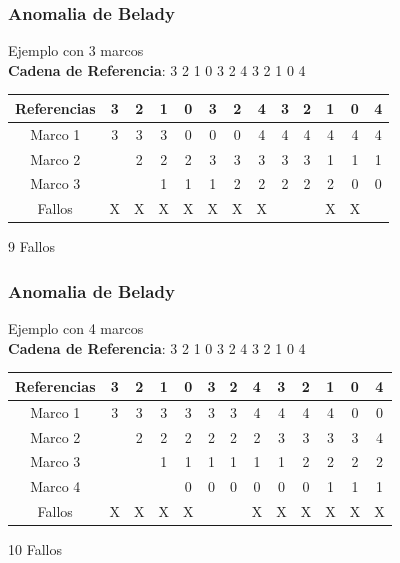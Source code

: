 \documentclass{beamer}
\begin{document}
\begin{frame}
	\begin{table}[h]
		\frametitle{Anomalia de Belady}
		Ejemplo con 3 marcos \\
		\textbf{Cadena de Referencia}: 3 2 1 0 3 2 4 3 2 1 0 4
		\begin{tabular}{|c||c|c|c|c|c|c|c|c|c|c|c|c|}
			\hline
			Referencias & 3 & 2 & 1 & 0 & 3 & 2 & 4 & 3 & 2 & 1 & 0 & 4 \\ \hline \hline
			Marco 1     & 3 & 3 & 3 & 0 & 0 & 0 & 4 & 4 & 4 & 4 & 4 & 4 \\ \hline
			Marco 2     &   & 2 & 2 & 2 & 3 & 3 & 3 & 3 & 3 & 1 & 1 & 1 \\ \hline
			Marco 3     &   &   & 1 & 1 & 1 & 2 & 2 & 2 & 2 & 2 & 0 & 0 \\ \hline
			Fallos      & X & X & X & X & X & X & X &   &   & X & X &   \\ \hline
		\end{tabular}
	\end{table}
	9 Fallos
\end{frame}

\begin{frame}
	\begin{table}[h]
		\frametitle{Anomalia de Belady}
		Ejemplo con 4 marcos \\
		\textbf{Cadena de Referencia}: 3 2 1 0 3 2 4 3 2 1 0 4
		\begin{tabular}{|c||c|c|c|c|c|c|c|c|c|c|c|c|}
			\hline
			Referencias & 3 & 2 & 1 & 0 & 3 & 2 & 4 & 3 & 2 & 1 & 0 & 4 \\ \hline \hline
			Marco 1     & 3 & 3 & 3 & 3 & 3 & 3 & 4 & 4 & 4 & 4 & 0 & 0 \\ \hline
			Marco 2     &   & 2 & 2 & 2 & 2 & 2 & 2 & 3 & 3 & 3 & 3 & 4 \\ \hline
			Marco 3     &   &   & 1 & 1 & 1 & 1 & 1 & 1 & 2 & 2 & 2 & 2 \\ \hline
			Marco 4     &   &   &   & 0 & 0 & 0 & 0 & 0 & 0 & 1 & 1 & 1 \\ \hline
			Fallos      & X & X & X & X &   &   & X & X & X & X & X & X  \\ \hline
		\end{tabular}
	\end{table}
	10 Fallos
\end{frame}
\end{document}
